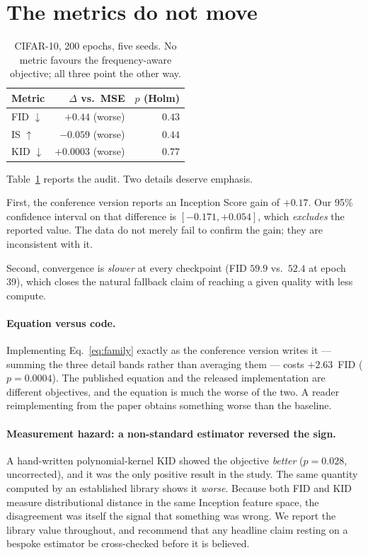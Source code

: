 \section{The metrics do not move}
\label{sec:replication}

\begin{table}[t]
\centering
\caption{CIFAR-10, 200 epochs, five seeds. No metric favours the
frequency-aware objective; all three point the other way.}
\label{tab:replication}
\begin{tabular}{lrr}
\toprule
Metric & $\Delta$ vs.\ MSE & $p$ (Holm) \\
\midrule
FID $\downarrow$ & $+0.44$ (worse) & $0.43$ \\
IS $\uparrow$ & $-0.059$ (worse) & $0.44$ \\
KID $\downarrow$ & $+0.0003$ (worse) & $0.77$ \\
\bottomrule
\end{tabular}
\end{table}

Table~\ref{tab:replication} reports the audit. Two details deserve emphasis.

First, the conference version reports an Inception Score gain of $+0.17$. Our
95\% confidence interval on that difference is $[-0.171, +0.054]$, which
\emph{excludes} the reported value. The data do not merely fail to confirm the
gain; they are inconsistent with it.

Second, convergence is \emph{slower} at every checkpoint (FID $59.9$ vs.\
$52.4$ at epoch 39), which closes the natural fallback claim of reaching a
given quality with less compute.

\paragraph{Equation versus code.} Implementing Eq.~\ref{eq:family} exactly as
the conference version writes it --- summing the three detail bands rather than
averaging them --- costs $+2.63$~FID ($p = 0.0004$). The published equation and
the released implementation are different objectives, and the equation is much
the worse of the two. A reader reimplementing from the paper obtains something
worse than the baseline.

\paragraph{Measurement hazard: a non-standard estimator reversed the sign.}
A hand-written polynomial-kernel KID showed the objective \emph{better}
($p = 0.028$, uncorrected), and it was the only positive result in the study.
The same quantity computed by an established library shows it \emph{worse}.
Because both FID and KID measure distributional distance in the same Inception
feature space, the disagreement was itself the signal that something was wrong.
We report the library value throughout, and recommend that any headline claim
resting on a bespoke estimator be cross-checked before it is believed.
